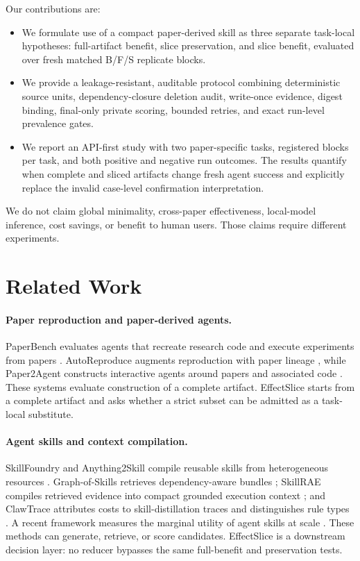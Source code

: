 \documentclass[letterpaper]{article} %
\begin{document}
Our contributions are:
\begin{itemize}
    \item We formulate use of a compact paper-derived skill as three separate
    task-local hypotheses: full-artifact benefit, slice preservation, and slice
    benefit, evaluated over fresh matched B/F/S replicate blocks.
    \item We provide a leakage-resistant, auditable protocol combining
    deterministic source units, dependency-closure deletion audit, write-once
    evidence, digest binding, final-only private scoring, bounded retries, and
    exact run-level prevalence gates.
    \item We report an API-first study with two paper-specific tasks,
    \EffectSliceReplicatesPerTask{} registered blocks per task, and both
    positive and negative run outcomes.  The results quantify when complete and
    sliced artifacts change fresh agent success and explicitly replace the
    invalid case-level confirmation interpretation.
\end{itemize}

We do not claim global minimality, cross-paper effectiveness, local-model
inference, cost savings, or benefit to human users.  Those claims require
different experiments.

\section{Related Work}

\paragraph{Paper reproduction and paper-derived agents.}
PaperBench evaluates agents that recreate research code and execute experiments
from papers \cite{starace2025paperbench}.  AutoReproduce augments reproduction
with paper lineage \cite{zhao2025autoreproduce}, while Paper2Agent constructs
interactive agents around papers and associated code
\cite{miao2025paper2agent}.  These systems evaluate construction of a complete
artifact.  EffectSlice starts from a complete artifact and asks whether a
strict subset can be admitted as a task-local substitute.

\paragraph{Agent skills and context compilation.}
SkillFoundry and Anything2Skill compile reusable skills from heterogeneous
resources \cite{shen2026skillfoundry,pan2026anything2skill}.  Graph-of-Skills
retrieves dependency-aware bundles \cite{liu2026graphskills}; SkillRAE compiles
retrieved evidence into compact grounded execution context
\cite{meng2026skillrae}; and ClawTrace attributes costs to skill-distillation
traces and distinguishes rule types \cite{yuan2026clawtrace}.  A recent
framework measures the marginal utility of agent skills at scale
\cite{shaposhnikov2026agenticskills}.  These methods can generate, retrieve, or
score candidates.  EffectSlice is a downstream decision layer: no reducer
bypasses the same full-benefit and preservation tests.
\end{document}
